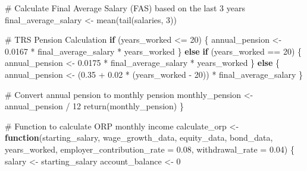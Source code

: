 \documentclass[
  letterpaper,
  DIV=11,
  numbers=noendperiod]{scrartcl}
\newenvironment{Shaded}{\begin{snugshade}}{\end{snugshade}}
\newcommand{\AttributeTok}[1]{\textcolor[rgb]{0.40,0.45,0.13}{#1}}
\newcommand{\CommentTok}[1]{\textcolor[rgb]{0.37,0.37,0.37}{#1}}
\newcommand{\ControlFlowTok}[1]{\textcolor[rgb]{0.00,0.23,0.31}{\textbf{#1}}}
\newcommand{\DecValTok}[1]{\textcolor[rgb]{0.68,0.00,0.00}{#1}}
\newcommand{\FloatTok}[1]{\textcolor[rgb]{0.68,0.00,0.00}{#1}}
\newcommand{\FunctionTok}[1]{\textcolor[rgb]{0.28,0.35,0.67}{#1}}
\newcommand{\NormalTok}[1]{\textcolor[rgb]{0.00,0.23,0.31}{#1}}
\newcommand{\OtherTok}[1]{\textcolor[rgb]{0.00,0.23,0.31}{#1}}
\newcommand{\SpecialCharTok}[1]{\textcolor[rgb]{0.37,0.37,0.37}{#1}}
\begin{document}
\begin{Shaded}
\begin{Highlighting}[]
  \CommentTok{\# Calculate Final Average Salary (FAS) based on the last 3 years}
\NormalTok{  final\_average\_salary }\OtherTok{\textless{}{-}} \FunctionTok{mean}\NormalTok{(}\FunctionTok{tail}\NormalTok{(salaries, }\DecValTok{3}\NormalTok{))}
  
  \CommentTok{\# TRS Pension Calculation}
  \ControlFlowTok{if}\NormalTok{ (years\_worked }\SpecialCharTok{\textless{}=} \DecValTok{20}\NormalTok{) \{}
\NormalTok{    annual\_pension }\OtherTok{\textless{}{-}} \FloatTok{0.0167} \SpecialCharTok{*}\NormalTok{ final\_average\_salary }\SpecialCharTok{*}\NormalTok{ years\_worked}
\NormalTok{  \} }\ControlFlowTok{else} \ControlFlowTok{if}\NormalTok{ (years\_worked }\SpecialCharTok{==} \DecValTok{20}\NormalTok{) \{}
\NormalTok{    annual\_pension }\OtherTok{\textless{}{-}} \FloatTok{0.0175} \SpecialCharTok{*}\NormalTok{ final\_average\_salary }\SpecialCharTok{*}\NormalTok{ years\_worked}
\NormalTok{  \} }\ControlFlowTok{else}\NormalTok{ \{}
\NormalTok{    annual\_pension }\OtherTok{\textless{}{-}}\NormalTok{ (}\FloatTok{0.35} \SpecialCharTok{+} \FloatTok{0.02} \SpecialCharTok{*}\NormalTok{ (years\_worked }\SpecialCharTok{{-}} \DecValTok{20}\NormalTok{)) }\SpecialCharTok{*}\NormalTok{ final\_average\_salary}
\NormalTok{  \}}

  \CommentTok{\# Convert annual pension to monthly pension}
\NormalTok{  monthly\_pension }\OtherTok{\textless{}{-}}\NormalTok{ annual\_pension }\SpecialCharTok{/} \DecValTok{12}
  \FunctionTok{return}\NormalTok{(monthly\_pension)}
\NormalTok{\}}

\CommentTok{\# Function to calculate ORP monthly income}
\NormalTok{calculate\_orp }\OtherTok{\textless{}{-}} \ControlFlowTok{function}\NormalTok{(starting\_salary, wage\_growth\_data, equity\_data, bond\_data, years\_worked, }\AttributeTok{employer\_contribution\_rate =} \FloatTok{0.08}\NormalTok{, }\AttributeTok{withdrawal\_rate =} \FloatTok{0.04}\NormalTok{) \{}
\NormalTok{  salary }\OtherTok{\textless{}{-}}\NormalTok{ starting\_salary}
\NormalTok{  account\_balance }\OtherTok{\textless{}{-}} \DecValTok{0}
  

\end{Highlighting}
\end{Shaded}
\end{document}
